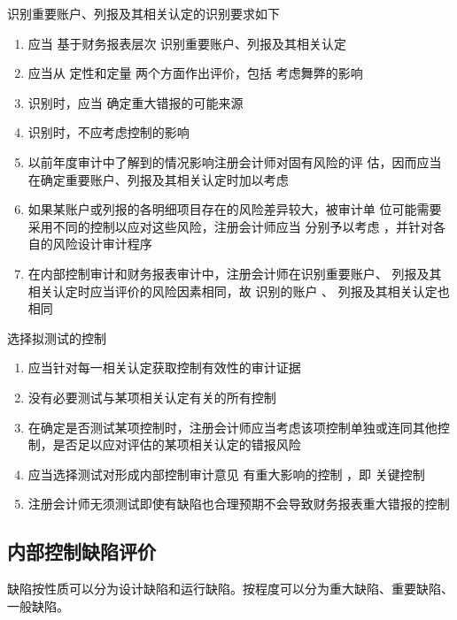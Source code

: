 \documentclass[UTF8,12pt]{ctexart}
\numberwithin{equation}{section} %
\numberwithin{figure}{section}
\numberwithin{table}{section}
\begin{document}
	识别重要账户、列报及其相关认定的识别要求如下
	\begin{enumerate}
		\item 应当  基于财务报表层次  识别重要账户、列报及其相关认定 
		
		\item 应当从  定性和定量  两个方面作出评价，包括  考虑舞弊的影响 
		
		\item 识别时，应当  确定重大错报的可能来源 
		
		\item 识别时，不应考虑控制的影响 
		
		\item 以前年度审计中了解到的情况影响注册会计师对固有风险的评 估，因而应当在确定重要账户、列报及其相关认定时加以考虑 
		
		\item 如果某账户或列报的各明细项目存在的风险差异较大，被审计单 位可能需要采用不同的控制以应对这些风险，注册会计师应当 分别予以考虑  ，并针对各自的风险设计审计程序 
		
		\item 在内部控制审计和财务报表审计中，注册会计师在识别重要账户、 列报及其相关认定时应当评价的风险因素相同，故 识别的账户 、 列报及其相关认定也相同
	\end{enumerate}
	
	选择拟测试的控制
	\begin{enumerate}
		\item 应当针对每一相关认定获取控制有效性的审计证据 
		
		\item 没有必要测试与某项相关认定有关的所有控制 
		
		\item 在确定是否测试某项控制时，注册会计师应当考虑该项控制单独或连同其他控 制，是否足以应对评估的某项相关认定的错报风险 
		
		\item 应当选择测试对形成内部控制审计意见  有重大影响的控制  ，即  关键控制 
		
		\item 注册会计师无须测试即使有缺陷也合理预期不会导致财务报表重大错报的控制
	\end{enumerate}
	
	\subsection{内部控制缺陷评价}
	缺陷按性质可以分为设计缺陷和运行缺陷。按程度可以分为重大缺陷、重要缺陷、一般缺陷。
	
\end{document}
